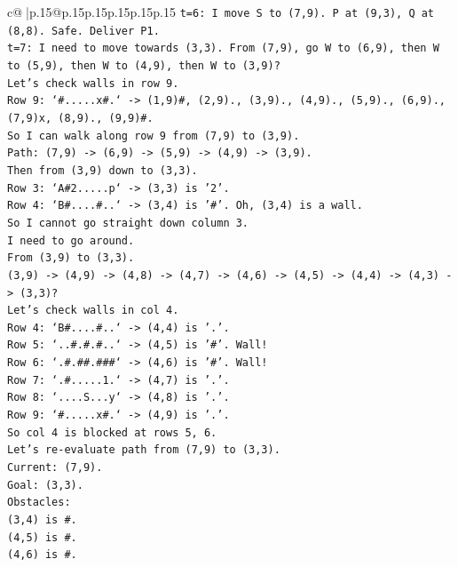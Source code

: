 \documentclass{article}
\begin{document}
{\begin{supertabular}{c@{$\;$}|p{.15\linewidth}@{}p{.15\linewidth}p{.15\linewidth}p{.15\linewidth}p{.15\linewidth}p{.15\linewidth}}
{{{\texttt{t=6: I move S to (7,9). P at (9,3), Q at (8,8). Safe. Deliver P1.} \\
\texttt{t=7: I need to move towards (3,3). From (7,9), go W to (6,9), then W to (5,9), then W to (4,9), then W to (3,9)?} \\
\texttt{Let's check walls in row 9.} \\
\texttt{Row 9: `\#.....x\#.` {-}> (1,9)\#, (2,9)., (3,9)., (4,9)., (5,9)., (6,9)., (7,9)x, (8,9)., (9,9)\#.} \\
\texttt{So I can walk along row 9 from (7,9) to (3,9).} \\
\texttt{Path: (7,9) {-}> (6,9) {-}> (5,9) {-}> (4,9) {-}> (3,9).} \\
\texttt{Then from (3,9) down to (3,3).} \\
\texttt{Row 3: `A\#2.....p` {-}> (3,3) is '2'.} \\
\texttt{Row 4: `B\#....\#..` {-}> (3,4) is '\#'. Oh, (3,4) is a wall.} \\
\texttt{So I cannot go straight down column 3.} \\
\texttt{I need to go around.} \\
\texttt{From (3,9) to (3,3).} \\
\texttt{(3,9) {-}> (4,9) {-}> (4,8) {-}> (4,7) {-}> (4,6) {-}> (4,5) {-}> (4,4) {-}> (4,3) {-}> (3,3)?} \\
\texttt{Let's check walls in col 4.} \\
\texttt{Row 4: `B\#....\#..` {-}> (4,4) is '.'.} \\
\texttt{Row 5: `..\#.\#.\#..` {-}> (4,5) is '\#'. Wall!} \\
\texttt{Row 6: `.\#.\#\#.\#\#\#` {-}> (4,6) is '\#'. Wall!} \\
\texttt{Row 7: `.\#.....1.` {-}> (4,7) is '.'.} \\
\texttt{Row 8: `....S...y` {-}> (4,8) is '.'.} \\
\texttt{Row 9: `\#.....x\#.` {-}> (4,9) is '.'.} \\
\texttt{So col 4 is blocked at rows 5, 6.} \\
\texttt{Let's re{-}evaluate path from (7,9) to (3,3).} \\
\texttt{Current: (7,9).} \\
\texttt{Goal: (3,3).} \\
\texttt{Obstacles:} \\
\texttt{(3,4) is \#.} \\
\texttt{(4,5) is \#.} \\
\texttt{(4,6) is \#.} \\
}}}
\end{supertabular}}
\end{document}
